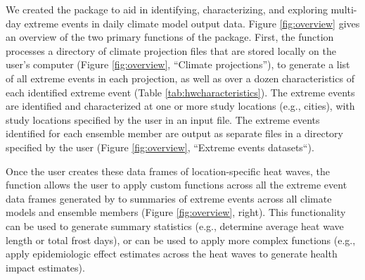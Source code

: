 We created the  package to aid in identifying,
characterizing, and exploring multi-day extreme events in daily climate
model output data. Figure \ref{fig:overview} gives an overview of the
two primary functions of the  package. First, the
 function processes a directory of climate projection
files that are stored locally on the user's computer (Figure
\ref{fig:overview}, ``Climate projections''), to generate a list of all
extreme events in each projection, as well as over a dozen
characteristics of each identified extreme event (Table
\ref{tab:hwcharacteristics}). The extreme events are identified and
characterized at one or more study locations (e.g., cities), with study
locations specified by the user in an input file. The extreme events
identified for each ensemble member are output as separate files in a
directory specified by the user (Figure \ref{fig:overview}, ``Extreme
events datasets``).

Once the user creates these data frames of location-specific heat waves,
the  function allows the user to apply custom
functions across all the extreme event data frames generated by
 to summaries of extreme events across all climate
models and ensemble members (Figure \ref{fig:overview}, right). This
functionality can be used to generate summary statistics (e.g.,
determine average heat wave length or total frost days), or can be used
to apply more complex functions (e.g., apply epidemiologic effect
estimates across the heat waves to generate health impact estimates).

